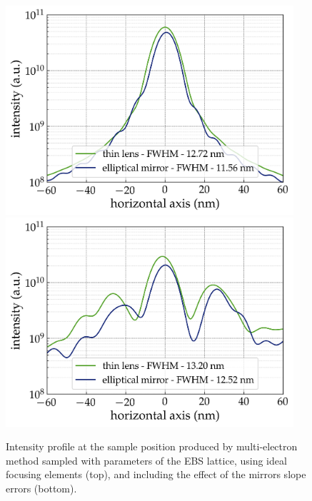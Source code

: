 \documentclass{iucr}              %
\begin{document}
\begin{figure}
    \centering
        \includegraphics[width=0.95\textwidth]{GRAPHICS/EBS_ideal.png}
        \includegraphics[width=0.95\textwidth]{GRAPHICS/EBS_real.png}
    \label{fig:FiniteEmittanceB}
    \caption{
    Intensity profile at the sample position produced by multi-electron method sampled with parameters of the EBS lattice, using ideal focusing elements (top), and including the effect of the mirrors slope errors (bottom).
    }
\end{figure}
\end{document}
